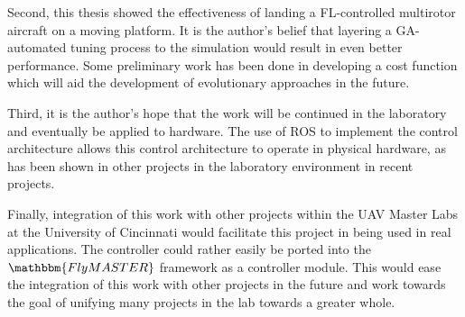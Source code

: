 Second, this thesis showed the effectiveness of landing a FL-controlled multirotor aircraft on a moving
platform. It is the author's belief that layering a GA-automated tuning process to the simulation would result
in even better performance. Some preliminary work has been done in developing a cost function which will aid
the development of evolutionary approaches in the future.

Third, it is the author's hope that the work will be continued in the laboratory and eventually be applied to
hardware.  The use of ROS to implement the control architecture allows this control architecture to operate in
physical hardware, as has been shown in other projects in the laboratory environment in recent projects.

Finally, integration of this work with other projects within the UAV Master Labs at the University of
Cincinnati would facilitate this project in being used in real applications. The controller could rather
easily be ported into the $\mathbbm{FlyMASTER}$ framework as a controller module. This would ease the
integration of this work with other projects in the future and work towards the goal of unifying many projects
in the lab towards a greater whole.

